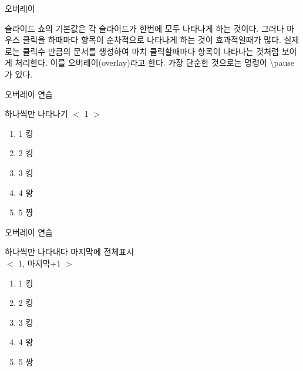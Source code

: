 \documentclass[ aspectratio=169,  10pt,blue,xcolor=pdftex,dvipsnames,table,handout,notes]{beamer}
\begin{document}
		\begin{frame}[plain]
		\centering

		\end{frame}


		\begin{frame}[t]{오버레이}

		슬라이드 쇼의 기본값은 각 슬라이드가 한번에 모두 나타나게 하는 것이다.
		그러나 마우스 클릭을 하때마다 항목이 순차적으로 나타나게 하는 것이 효과적일때가 많다.
		실제로는 클릭수 만큼의 문서를 생성하여 마치 클릭할때마다 항목이 나타나는 것처럼 보이게 처리한다. 
		이를 오버레이(overlay)라고 한다. 가장 단순한 것으로는 명령어 \textbackslash pause가 있다.


		\end{frame}

		\begin{frame}[t]{오버레이 연습}

			\begin{block} {하나씩만 나타나기 $<$ 1 $>$ }
			\begin{enumerate}
			\item <1> 1 킹
			\item <2> 2 킹
			\item <3> 3 킹
			\item <4> 4 왕
			\item <5> 5 짱
			\end{enumerate}
			\end{block} 

		\end{frame}

		\begin{frame}[t]{오버레이 연습}

			\begin{block} {하나씩만 나타내다 마지막에 전체표시\\
						$<$ 1, 마지막+1 $>$ }
			\begin{enumerate}
			\item <1,6> 1 킹
			\item <2,6> 2 킹
			\item <3,6> 3 킹
			\item <4,6> 4 왕
			\item <5,6> 5 짱
			\end{enumerate}
			\end{block} 

		\end{frame}
\end{document}
